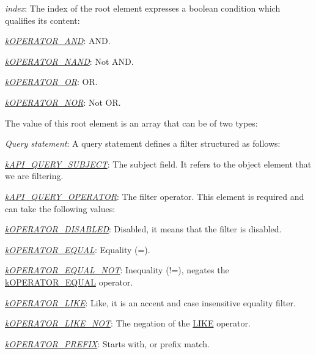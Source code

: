 {\itshape 
\begin{DoxyItemize}
\item {\itshape index}\-: The index of the root element expresses a boolean condition which qualifies its content\-: 
\begin{DoxyItemize}
\item {\itshape \hyperlink{}{k\-O\-P\-E\-R\-A\-T\-O\-R\-\_\-\-A\-N\-D}}\-: A\-N\-D. 
\item {\itshape \hyperlink{}{k\-O\-P\-E\-R\-A\-T\-O\-R\-\_\-\-N\-A\-N\-D}}\-: Not A\-N\-D. 
\item {\itshape \hyperlink{}{k\-O\-P\-E\-R\-A\-T\-O\-R\-\_\-\-O\-R}}\-: O\-R. 
\item {\itshape \hyperlink{}{k\-O\-P\-E\-R\-A\-T\-O\-R\-\_\-\-N\-O\-R}}\-: Not O\-R. 
\end{DoxyItemize}The value of this root element is an array that can be of two types\-: 
\begin{DoxyItemize}
\item {\itshape Query statement}\-: A query statement defines a filter structured as follows\-: 
\begin{DoxyItemize}
\item {\itshape \hyperlink{}{k\-A\-P\-I\-\_\-\-Q\-U\-E\-R\-Y\-\_\-\-S\-U\-B\-J\-E\-C\-T}}\-: The subject field. It refers to the object element that we are filtering. 
\item {\itshape \hyperlink{}{k\-A\-P\-I\-\_\-\-Q\-U\-E\-R\-Y\-\_\-\-O\-P\-E\-R\-A\-T\-O\-R}}\-: The filter operator. This element is required and can take the following values\-: 
\begin{DoxyItemize}
\item {\itshape \hyperlink{}{k\-O\-P\-E\-R\-A\-T\-O\-R\-\_\-\-D\-I\-S\-A\-B\-L\-E\-D}}\-: Disabled, it means that the filter is disabled. 
\item {\itshape \hyperlink{}{k\-O\-P\-E\-R\-A\-T\-O\-R\-\_\-\-E\-Q\-U\-A\-L}}\-: Equality (=). 
\item {\itshape \hyperlink{}{k\-O\-P\-E\-R\-A\-T\-O\-R\-\_\-\-E\-Q\-U\-A\-L\-\_\-\-N\-O\-T}}\-: Inequality (!=), negates the \hyperlink{}{k\-O\-P\-E\-R\-A\-T\-O\-R\-\_\-\-E\-Q\-U\-A\-L} operator. 
\item {\itshape \hyperlink{}{k\-O\-P\-E\-R\-A\-T\-O\-R\-\_\-\-L\-I\-K\-E}}\-: Like, it is an accent and case insensitive equality filter. 
\item {\itshape \hyperlink{}{k\-O\-P\-E\-R\-A\-T\-O\-R\-\_\-\-L\-I\-K\-E\-\_\-\-N\-O\-T}}\-: The negation of the \hyperlink{}{L\-I\-K\-E} operator. 
\item {\itshape \hyperlink{}{k\-O\-P\-E\-R\-A\-T\-O\-R\-\_\-\-P\-R\-E\-F\-I\-X}}\-: Starts with, or prefix match. 

\end{DoxyItemize}
\end{DoxyItemize}
\end{DoxyItemize}
\end{DoxyItemize}}
